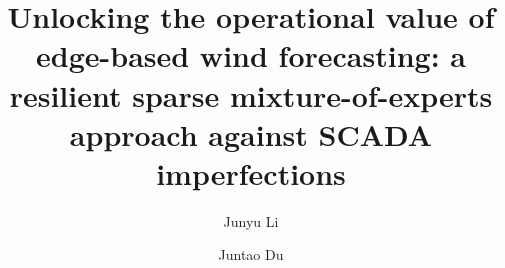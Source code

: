 \documentclass[review,3p,times]{elsarticle}
\newif\ifincludefrontmatterextras
\newenvironment{highlights}{\par\noindent\textbf{Highlights}\par\begin{itemize}\itemsep0pt}{\end{itemize}\par}%
\begin{document}
\begin{frontmatter}

\title{Unlocking the operational value of edge-based wind forecasting: a resilient sparse mixture-of-experts approach against SCADA imperfections}

\author[1]{Junyu Li}

\author[1]{Juntao Du}



\ifincludefrontmatterextras

\begin{highlights}
\item Outperforms strong linear baselines under 60\% noise via sparse routing.
\item Cuts dispatch cost by 34\% and curtailment by 60\% under SCADA noise.
\item Reports latency, energy per inference, and model size for edge deployment.
\item Sparse expert routing supports interpretable and auditable operation.
\end{highlights}
\fi


\end{frontmatter}
\end{document}
